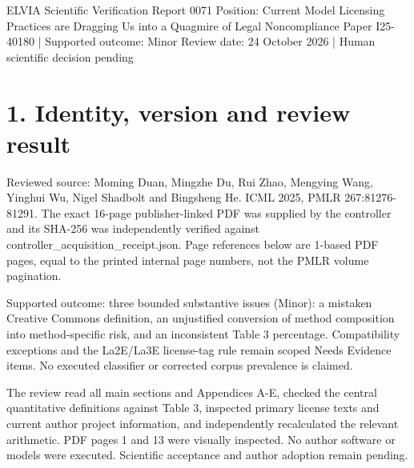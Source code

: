 \documentclass[10pt]{article}
\begin{document}
ELVIA Scientific Verification Report 0071
Position: Current Model Licensing Practices are Dragging Us into a Quagmire of Legal Noncompliance
Paper I25-40180 | Supported outcome: Minor
Review date: 24 October 2026 | Human scientific decision pending\par
\section*{1. Identity, version and review result}
Reviewed source: Moming Duan, Mingzhe Du, Rui Zhao, Mengying Wang, Yinghui Wu, Nigel Shadbolt and Bingsheng He. ICML 2025, PMLR 267:81276-81291. The exact 16-page publisher-linked PDF was supplied by the controller and its SHA-256 was independently verified against controller\_acquisition\_receipt.json. Page references below are 1-based PDF pages, equal to the printed internal page numbers, not the PMLR volume pagination.\par
Supported outcome: three bounded substantive issues (Minor): a mistaken Creative Commons definition, an unjustified conversion of method composition into method-specific risk, and an inconsistent Table 3 percentage. Compatibility exceptions and the La2E/La3E license-tag rule remain scoped Needs Evidence items. No executed classifier or corrected corpus prevalence is claimed.\par
The review read all main sections and Appendices A-E, checked the central quantitative definitions against Table 3, inspected primary license texts and current author project information, and independently recalculated the relevant arithmetic. PDF pages 1 and 13 were visually inspected. No author software or models were executed. Scientific acceptance and author adoption remain pending.\par
\end{document}

